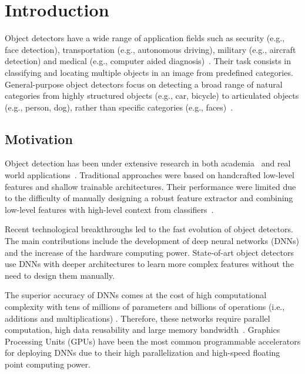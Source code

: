 \chapter{Introduction}
\label{chapter:introduction}

Object detectors have a wide range of application fields such as security (e.g., face detection), transportation (e.g., autonomous driving), military (e.g., aircraft detection) and medical (e.g., computer aided diagnosis)~\cite{jiao:obj_survey}. Their task consists in classifying and locating multiple objects in an image from predefined categories. General-purpose object detectors focus on detecting a broad range of natural categories from highly structured objects (e.g., car, bicycle) to articulated objects (e.g., person, dog), rather than specific categories (e.g., faces)~\cite{liu:obj_survey}.


\section{Motivation}

Object detection has been under extensive research in both academia~\citep{jiao:obj_survey, liu:obj_survey, zhao:obj_survey} and real world applications~\citep{unlu:real_app, ramesh:real_app}. Traditional approaches were based on handcrafted low-level features and shallow trainable architectures. Their performance were limited due to the difficulty of manually designing a robust feature extractor and combining low-level features with high-level context from classifiers~\cite{Mahony:trad}.   

Recent technological breakthroughs led to the fast evolution of object detectors. The main contributions include the development of deep neural networks (DNNs) and the increase of the hardware computing power. State-of-art object detectors use DNNs with deeper architectures to learn more complex features without the need to design them manually.

The superior accuracy of DNNs comes at the cost of high computational complexity with tens of millions of parameters and billions of operations (i.e., additions and multiplications) . Therefore, these networks require parallel computation, high data reusability and large memory bandwidth~\cite{feng:obj_survey}. Graphics Processing Units (GPUs) have been the most common programmable accelerators for deploying DNNs due to their high parallelization and high-speed floating point computing power.


